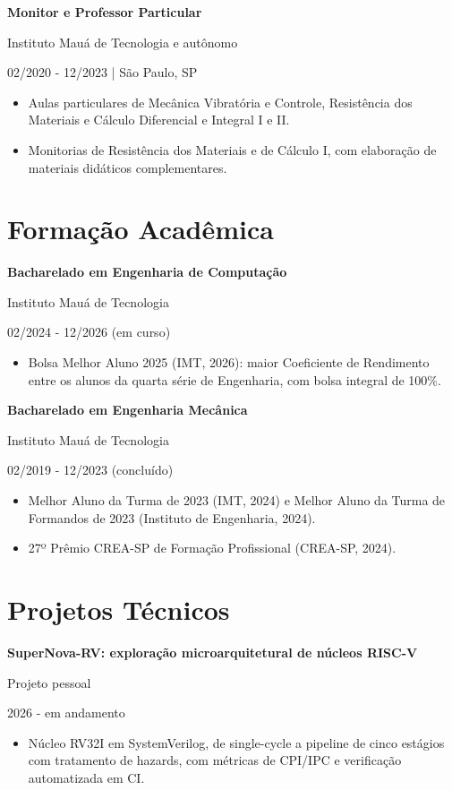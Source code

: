 \documentclass[10pt,a4paper]{article}
\newcommand{\entrada}[3]{%
  \textbf{#1}\par
  #2\par
  #3\par
  \vspace{2pt}}
\newcommand{\espaco}{\vspace{7pt}}
\begin{document}
\espaco
\entrada{Monitor e Professor Particular}
        {Instituto Mauá de Tecnologia e autônomo}
        {02/2020 - 12/2023 | São Paulo, SP}
\begin{itemize}
  \item Aulas particulares de Mecânica Vibratória e Controle, Resistência dos
        Materiais e Cálculo Diferencial e Integral I e II.
  \item Monitorias de Resistência dos Materiais e de Cálculo I, com elaboração
        de materiais didáticos complementares.
\end{itemize}

\section{Formação Acadêmica}

\entrada{Bacharelado em Engenharia de Computação}
        {Instituto Mauá de Tecnologia}
        {02/2024 - 12/2026 (em curso)}
\begin{itemize}
  \item Bolsa Melhor Aluno 2025 (IMT, 2026): maior Coeficiente de Rendimento
        entre os alunos da quarta série de Engenharia, com bolsa integral de
        100\%.
\end{itemize}

\espaco
\entrada{Bacharelado em Engenharia Mecânica}
        {Instituto Mauá de Tecnologia}
        {02/2019 - 12/2023 (concluído)}
\begin{itemize}
  \item Melhor Aluno da Turma de 2023 (IMT, 2024) e Melhor Aluno da Turma de
        Formandos de 2023 (Instituto de Engenharia, 2024).
  \item 27º Prêmio CREA-SP de Formação Profissional (CREA-SP, 2024).
\end{itemize}

\section{Projetos Técnicos}

\entrada{SuperNova-RV: exploração microarquitetural de núcleos RISC-V}
        {Projeto pessoal}
        {2026 - em andamento}
\begin{itemize}
  \item Núcleo RV32I em SystemVerilog, de single-cycle a pipeline de cinco
        estágios com tratamento de hazards, com métricas de CPI/IPC e
        verificação automatizada em CI.
\end{itemize}
\end{document}
